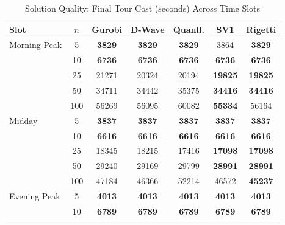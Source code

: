 \documentclass[conference]{IEEEtran}
\begin{document}

\begin{table}[htbp]
\caption{Solution Quality: Final Tour Cost (seconds) Across Time Slots}
\begin{center}
\begin{tabular}{|l|c|c|c|c|c|c|}
\hline
\textbf{Slot} & \textbf{$n$} & \textbf{Gurobi} & \textbf{D-Wave} & \textbf{Quanfl.} & \textbf{SV1} & \textbf{Rigetti} \\
\hline
Morning Peak & 5   & \textbf{3829}  & \textbf{3829}  & \textbf{3829}  & 3864           & \textbf{3829}  \\
             & 10  & \textbf{6736}  & \textbf{6736}  & \textbf{6736}  & \textbf{6736}  & \textbf{6736}  \\
             & 25  & 21271          & 20324          & 20194          & \textbf{19825} & \textbf{19825} \\
             & 50  & 34711          & 34442          & 35375          & \textbf{34416} & \textbf{34416} \\
             & 100 & 56269          & 56095          & 60082          & \textbf{55334} & 56164          \\
\hline
Midday       & 5   & \textbf{3837}  & \textbf{3837}  & \textbf{3837}  & \textbf{3837}  & \textbf{3837}  \\
             & 10  & \textbf{6616}  & \textbf{6616}  & \textbf{6616}  & \textbf{6616}  & \textbf{6616}  \\
             & 25  & 18345          & 18215          & 17416          & \textbf{17098} & \textbf{17098} \\
             & 50  & 29240          & 29169          & 29799          & \textbf{28991} & \textbf{28991} \\
             & 100 & 47184          & 46366          & 52214          & 46572          & \textbf{45237} \\
\hline
Evening Peak & 5   & \textbf{4013}  & \textbf{4013}  & \textbf{4013}  & \textbf{4013}  & \textbf{4013}  \\
             & 10  & \textbf{6789}  & \textbf{6789}  & \textbf{6789}  & \textbf{6789}  & \textbf{6789}  \\

\end{tabular}
\end{center}
\end{table}
\end{document}
